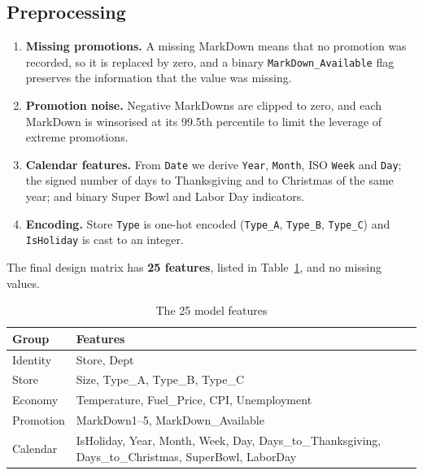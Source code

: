 \subsection{Preprocessing}
\begin{enumerate}
\item \textbf{Missing promotions.} A missing MarkDown means that no promotion was recorded, so it is replaced by zero, and a binary \texttt{MarkDown\_Available} flag preserves the information that the value was missing.
\item \textbf{Promotion noise.} Negative MarkDowns are clipped to zero, and each MarkDown is winsorised at its 99.5th percentile to limit the leverage of extreme promotions.
\item \textbf{Calendar features.} From \texttt{Date} we derive \texttt{Year}, \texttt{Month}, ISO \texttt{Week} and \texttt{Day}; the signed number of days to Thanksgiving and to Christmas of the same year; and binary Super Bowl and Labor Day indicators.
\item \textbf{Encoding.} Store \texttt{Type} is one-hot encoded (\texttt{Type\_A}, \texttt{Type\_B}, \texttt{Type\_C}) and \texttt{IsHoliday} is cast to an integer.
\end{enumerate}
The final design matrix has \textbf{25 features}, listed in Table~\ref{tab:features}, and no missing values.

\begin{table}[!t]
\caption{The 25 model features}
\label{tab:features}
\centering
\begin{tabular}{p{1.9cm}p{5.9cm}}
\toprule
Group & Features \\
\midrule
Identity & Store, Dept \\
Store & Size, Type\_A, Type\_B, Type\_C \\
Economy & Temperature, Fuel\_Price, CPI, Unemployment \\
Promotion & MarkDown1--5, MarkDown\_Available \\
Calendar & IsHoliday, Year, Month, Week, Day, Days\_to\_Thanksgiving, Days\_to\_Christmas, SuperBowl, LaborDay \\
\bottomrule
\end{tabular}
\end{table}

